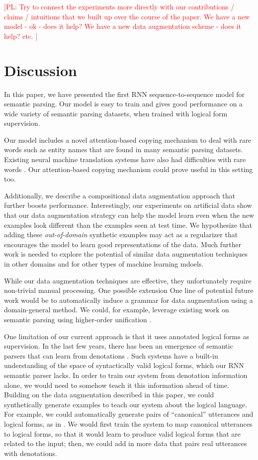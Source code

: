 \documentclass[11pt,letterpaper]{article}
\newcommand\pl[1]{\textcolor{red}{[PL: #1]}}
\begin{document}
\pl{
  Try to connect the experiments more directly with our contributions / claims
  / intuitions that we built up over the course of the paper.
  We have a new model - ok - does it help?
  We have a new data augmentation scheme - does it help?
  etc.
}

\section{Discussion}
In this paper, we have presented the first RNN sequence-to-sequence
model for semantic parsing.  Our model is easy to train
and gives good performance on a wide variety of semantic parsing
datasets, when trained with logical form supervision.

Our model includes a novel attention-based copying mechanism to deal with 
rare words such as entity names that are found in many semantic parsing datasets.
Existing neural machine translation systems have also had
difficulties with rare words \cite{luong2015rare}.
Our attention-based copying mechanism could prove useful in this setting too.

Additionally, we describe a compositional data augmentation approach that 
further boosts performance.
Interestingly, our experiments on artificial data show that
our data augmentation strategy can help the model learn
even when the new examples look different than the examples seen at test time.  
We hypothesize that adding these \emph{out-of-domain} synthetic examples
may act as a regularizer that encourages the model
to learn good representations of the data.
Much further work is needed to explore the potential of
similar data augmentation techniques in other domains
and for other types of machine learning mdoels.

While our data augmentation techniques are effective,
they unfortunately require non-trivial manual processing.
One possible extension 
One line of potential future work would be to
automatically induce a grammar for data augmentation
using a domain-general method.
We could, for example, leverage existing work on semantic parsing
using higher-order unification \cite{kwiatkowski10ccg}.

One limitation of our current approach is that it 
uses annotated logical forms as supervision.
In the last few years, there has been an emergence of
semantic parsers that can learn from denotations 
\cite{liang11dcs,berant2013freebase}.
Such systems have a built-in understanding of the space of
syntactically valid logical forms, which our RNN semantic parser lacks.
In order to train our system from denotation information alone,
we would need to somehow teach it this information ahead of time.
Building on the data augmentation described in this paper,
we could synthetically generate examples
to teach our system about the logical language.
For example, we could automatically generate
pairs of ``canonical'' utterances and logical forms,
as in \cite{wang2015overnight}.  
We would first train the system to map
canonical utterances to logical forms, so that it would learn to produce
valid logical forms that are related to the input;
then, we could add in more data that pairs real utterances with denotations.
\end{document}
